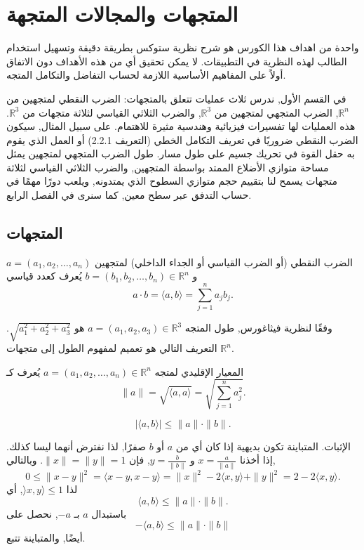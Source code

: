 \chapter{المتجهات والمجالات المتجهة}

واحدة من اهداف هذا الكورس هو شرح نظرية ستوكس بطريقة دقيقة وتسهيل استخدام الطالب لهذه النظرية في التطبيقات. لا يمكن تحقيق أي من هذه الأهداف دون الاتفاق أولاً على المفاهيم الأساسية اللازمة لحساب التفاضل والتكامل المتجه.

في القسم الأول, ندرس ثلاث عمليات تتعلق بالمتجهات: الضرب النقطي لمتجهين من \(\mathbb{R}^n\), الضرب المتجهي لمتجهين من \(\mathbb{R}^3\), والضرب الثلاثي القياسي لثلاثة متجهات من \(\mathbb{R}^3\). هذه العمليات لها تفسيرات فيزيائية وهندسية مثيرة للاهتمام. على سبيل المثال, سيكون الضرب النقطي ضروريًا في تعريف التكامل الخطي (التعريف 2.2.1) أو العمل الذي يقوم به حقل القوة في تحريك جسيم على طول مسار. طول الضرب المتجهي لمتجهين يمثل مساحة متوازي الأضلاع الممتد بواسطة المتجهين, والضرب الثلاثي القياسي لثلاثة متجهات يسمح لنا بتقييم حجم متوازي السطوح الذي يمتدونه, ويلعب دورًا مهمًا في حساب التدفق عبر سطح معين, كما سنرى في الفصل الرابع.

\section{المتجهات}

\begin{definition}
الضرب النقطي (أو الضرب القياسي أو الجداء الداخلي) لمتجهين \(a = (a_1, a_2, \ldots, a_n)\) و \(b = (b_1, b_2, \ldots, b_n) \in \mathbb{R}^n\) يُعرف كعدد قياسي
\[ a \cdot b = \langle a, b \rangle = \sum_{j=1}^n a_j b_j. \]
\end{definition}

وفقًا لنظرية فيثاغورس, طول المتجه \(a = (a_1, a_2, a_3) \in \mathbb{R}^3\) هو \(\sqrt{a_1^2 + a_2^2 + a_3^2}\). التعريف التالي هو تعميم لمفهوم الطول إلى متجهات \(\mathbb{R}^n\).

\begin{definition}
    
المعيار الإقليدي لمتجه \(a = (a_1, a_2, \ldots, a_n) \in \mathbb{R}^n\) يُعرف كـ
\[ \|a\| = \sqrt{\langle a, a \rangle} = \sqrt{\sum_{j=1}^n a_j^2}. \]
\end{definition}

\begin{theoreme}
\[ |\langle a, b \rangle| \leq \|a\| \cdot \|b\|. \]
\end{theoreme}

الإثبات. المتباينة تكون بديهية إذا كان أي من \(a\) أو \(b\) صفرًا, لذا نفترض أنهما ليسا كذلك. إذا أخذنا \(x = \frac{a}{\|a\|}\) و \(y = \frac{b}{\|b\|}\), فإن \(\|x\| = \|y\| = 1\). وبالتالي,
\[ 0 \leq \|x - y\|^2 = \langle x - y, x - y \rangle = \|x\|^2 - 2 \langle x, y \rangle + \|y\|^2 = 2 - 2 \langle x, y \rangle. \]
لذا \(\rangle x, y \rangle \leq 1\), أي
\[ \langle a, b \rangle \leq \|a\| \cdot \|b\|. \]
باستبدال \(a\) بـ \(-a\), نحصل على
\[ -\langle a, b \rangle \leq \|a\| \cdot \|b\| \]
أيضًا, والمتباينة تتبع. 


